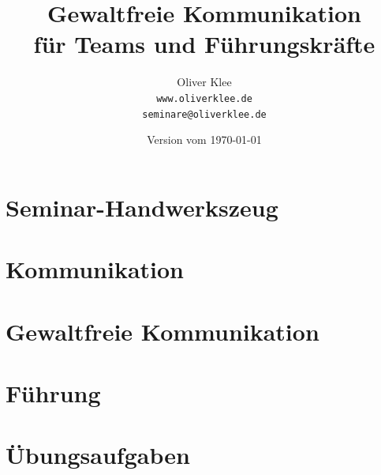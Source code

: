 \documentclass[a4paper,openany,twoside,titlepage,10pt,headsepline]{scrbook}
\title{Gewaltfreie Kommunikation\\für Teams und Führungskräfte}
\author{Oliver Klee\\\texttt{www.oliverklee.de}\\\texttt{seminare@oliverklee.de}}
\date{Version vom \today}
\begin{document}
    \frontmatter

    \maketitle

    \tableofcontents


    \mainmatter


    \chapter{Seminar-Handwerkszeug}
    
    
    
    


    \chapter{Kommunikation}
    
    
    
    
    


    \chapter{Gewaltfreie Kommunikation}
    
    
    
    
    
    
    
    
    
    
    
    
    
    
    
    
    
    


    \chapter{Führung}
    
    
    
    
    
    


    \chapter{Übungsaufgaben}
    
    
    

    \backmatter

    

    

    \printindex
\end{document}
